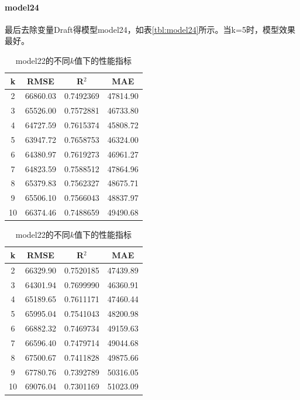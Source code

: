 \documentclass[a4paper,12pt,onecolumn,oneside]{article}
\begin{document}
	\paragraph{model24}最后去除变量Draft得模型model24，如表\ref{tbl:model24}所示。当k=5时，模型效果最好。\par
		\begin{table}[h]
		\centering
		\begin{subtable}{0.45\textwidth}
			\centering
			\begin{tabular}{cccc}
				\toprule
				k & RMSE & R$^2$ & MAE \\
				\midrule
				2 & 66860.03 & 0.7492369 & 47814.90\\
				3 & 65526.00 & 0.7572881 & 46733.80\\
				4 & 64727.59 & 0.7615374 & 45808.72\\
\rowcolor{gray!25}5 & 63947.72 & 0.7658753 & 46324.00\\
				6 & 64380.97 & 0.7619273 & 46961.27\\
				7 & 64823.59 & 0.7588512 & 47864.96\\
				8 & 65379.83 & 0.7562327 & 48675.71\\
				9 & 65506.10 & 0.7566043 & 48837.97\\
				10 & 66374.46 & 0.7488659 & 49490.68\\
				\bottomrule
			\end{tabular}
			\caption{model21的不同$k$值下的性能指标}
			\label{tbl:model21}
		\end{subtable}
		\hfill
		\begin{subtable}{0.45\textwidth}
			\centering
			\begin{tabular}{cccc}
				\toprule
				k & RMSE & R$^2$ & MAE \\
				\midrule
				2 & 66329.90 & 0.7520185 & 47439.89\\
\rowcolor{gray!25}3 & 64301.94 & 0.7699990 & 46360.91\\
				4 & 65189.65 & 0.7611171 & 47460.44\\
				5 & 65995.04 & 0.7541043 & 48200.98\\
				6 & 66882.32 & 0.7469734 & 49159.63\\
				7 & 66596.40 & 0.7479714 & 49044.68\\
				8 & 67500.67 & 0.7411828 & 49875.66\\
				9 & 67780.76 & 0.7392789 & 50316.05\\
				10 & 69076.04 & 0.7301169 & 51023.09\\
				\bottomrule
			\end{tabular}
			\caption{model22的不同$k$值下的性能指标}
			\label{tbl:model22}
		\end{subtable}
		\end{table}
\end{document}
